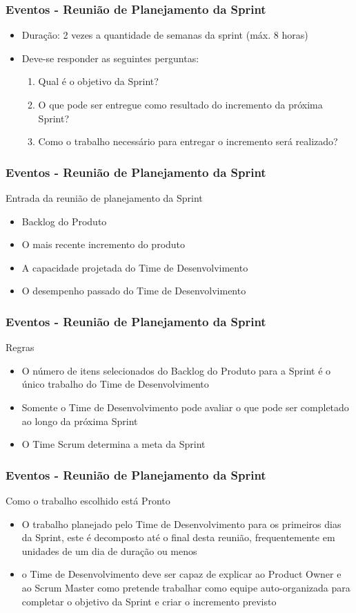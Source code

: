 \begin{frame}
 \frametitle{Eventos - Reunião de Planejamento da Sprint}

 \begin{itemize}
  \item Duração: 2 vezes a quantidade de semanas da sprint (máx. 8 horas)
  \item Deve-se responder as seguintes perguntas:
  \begin{enumerate}
   \item Qual é o objetivo da Sprint?
  \item O que pode ser entregue como resultado do incremento da próxima Sprint?
    \item Como o trabalho necessário para entregar o incremento será realizado?
  \end{enumerate}
 \end{itemize}
\end{frame}

\begin{frame}
 \frametitle{Eventos - Reunião de Planejamento da Sprint}
 Entrada da reunião de planejamento da Sprint
 \begin{itemize}
  \item Backlog do Produto
  \item O mais recente incremento do produto
  \item A capacidade projetada do Time de Desenvolvimento
  \item O desempenho passado do Time de Desenvolvimento
 \end{itemize}
\end{frame}

\begin{frame}
 \frametitle{Eventos - Reunião de Planejamento da Sprint}
Regras
 \begin{itemize}
  \item O número de itens selecionados do Backlog do Produto para a Sprint é o único trabalho do Time de Desenvolvimento
  \item Somente o Time de Desenvolvimento pode avaliar o que pode ser completado ao longo da próxima Sprint
  \item O Time Scrum determina a meta da Sprint
 \end{itemize}
\end{frame}


\begin{frame}
 \frametitle{Eventos - Reunião de Planejamento da Sprint}
Como o trabalho escolhido está Pronto
 \begin{itemize}
  \item O trabalho planejado pelo Time de Desenvolvimento para os primeiros dias da Sprint, este é decomposto até o final desta
reunião, frequentemente em unidades de um dia de duração ou menos
\item o Time de Desenvolvimento deve ser capaz de explicar ao Product Owner e ao Scrum Master como pretende trabalhar como equipe auto-organizada
para completar o objetivo da Sprint e criar o incremento previsto
 \end{itemize}
\end{frame}


